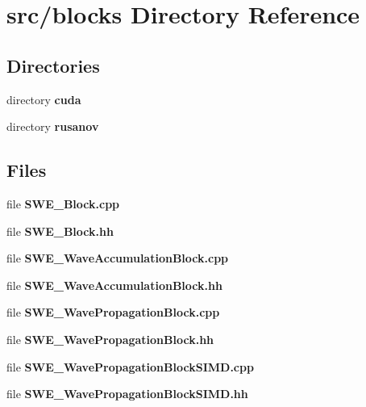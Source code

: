 \section{src/blocks Directory Reference}
\label{dir_b2e0cd1ddd0a904cb261e9b68779deb4}
\subsection*{Directories}
\begin{DoxyCompactItemize}
\item 
directory {\bf cuda}
\item 
directory {\bf rusanov}
\end{DoxyCompactItemize}
\subsection*{Files}
\begin{DoxyCompactItemize}
\item 
file {\bf S\-W\-E\-\_\-\-Block.\-cpp}
\item 
file {\bf S\-W\-E\-\_\-\-Block.\-hh}
\item 
file {\bf S\-W\-E\-\_\-\-Wave\-Accumulation\-Block.\-cpp}
\item 
file {\bf S\-W\-E\-\_\-\-Wave\-Accumulation\-Block.\-hh}
\item 
file {\bf S\-W\-E\-\_\-\-Wave\-Propagation\-Block.\-cpp}
\item 
file {\bf S\-W\-E\-\_\-\-Wave\-Propagation\-Block.\-hh}
\item 
file {\bf S\-W\-E\-\_\-\-Wave\-Propagation\-Block\-S\-I\-M\-D.\-cpp}
\item 
file {\bf S\-W\-E\-\_\-\-Wave\-Propagation\-Block\-S\-I\-M\-D.\-hh}
\end{DoxyCompactItemize}
